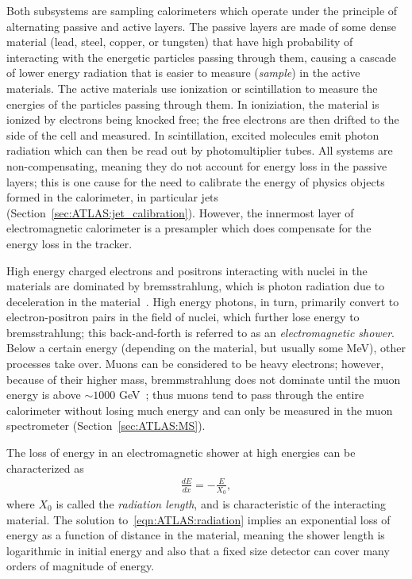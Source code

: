 Both subsystems are sampling calorimeters which operate under the principle of alternating passive and active layers.
The passive layers are made of some dense material (lead, steel, copper, or tungsten) that have high probability of interacting with the energetic particles passing through them, causing a cascade of lower energy radiation that is easier to measure (\textit{sample}) in the active materials.
The active materials use ionization or scintillation to measure the energies of the particles passing through them.
In ioniziation, the material is ionized by electrons being knocked free; the free electrons are then drifted to the side of the cell and measured.
In scintillation, excited molecules emit photon radiation which can then be read out by photomultiplier tubes.
All systems are non-compensating, meaning they do not account for energy loss in the passive layers; this is one cause for the need to calibrate the energy of physics objects formed in the calorimeter, in particular jets (Section~\ref{sec:ATLAS:jet_calibration}).
However, the innermost layer of electromagnetic calorimeter is a presampler which does compensate for the energy loss in the tracker.

High energy charged electrons and positrons interacting with nuclei in the materials are dominated by bremsstrahlung, which is photon radiation due to deceleration in the material~\cite{Lechner:2674116}.
High energy photons, in turn, primarily convert to electron-positron pairs in the field of nuclei, which further lose energy to bremsstrahlung; this back-and-forth is referred to as an \textit{electromagnetic shower}.
Below a certain energy (depending on the material, but usually some MeV), other processes take over.
Muons can be considered to be heavy electrons; however, because of their higher mass, bremmstrahlung does not dominate until the muon energy is above $\sim 1000$ GeV~\cite{TASI_day3_school}; thus muons tend to pass through the entire calorimeter without losing much energy and can only be measured in the muon spectrometer (Section~\ref{sec:ATLAS:MS}).

The loss of energy in an electromagnetic shower at high energies can be characterized as
\begin{align}
\frac{dE}{dx} = -\frac{E}{X_0},
\label{eqn:ATLAS:radiation}
\end{align}
where $X_0$ is called the \textit{radiation length}, and is characteristic of the interacting material. 
The solution to~\ref{eqn:ATLAS:radiation} implies an exponential loss of energy as a function of distance in the material, meaning the shower length is logarithmic in initial energy and also that a fixed size detector can cover many orders of magnitude of energy.

